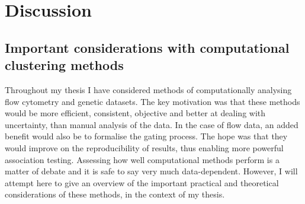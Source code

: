 \chapter{Discussion}


\section{ Important considerations with computational clustering methods }

Throughout my thesis I have considered methods of computationally analysing flow cytometry and genetic datasets.
The key motivation was that these methods would be more efficient, consistent, objective and better at dealing with uncertainty, than manual analysis of the data.
In the case of flow data, an added benefit would also be to formalise the gating process.
The hope was that they would improve on the reproducibility of results, thus enabling more powerful association testing.
Assessing how well computational methods perform is a matter of debate and it is safe to say very much data-dependent.
However, I will attempt here to give an overview of the important practical and theoretical considerations of these methods, in the context of my thesis.

